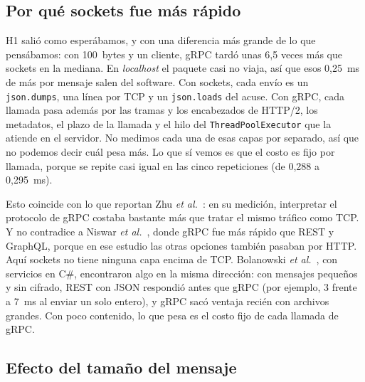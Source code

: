 \subsection{Por qué sockets fue más rápido}

H1 salió como esperábamos, y con una diferencia más grande de lo que pensábamos: con 100~bytes y un cliente, gRPC tardó unas 6,5 veces más que sockets en la mediana. En \emph{localhost} el paquete casi no viaja, así que esos 0,25~ms de más por mensaje salen del software. Con sockets, cada envío es un \texttt{json.dumps}, una línea por TCP y un \texttt{json.loads} del acuse. Con gRPC, cada llamada pasa además por las tramas y los encabezados de HTTP/2, los metadatos, el plazo de la llamada y el hilo del \texttt{ThreadPoolExecutor} que la atiende en el servidor. No medimos cada una de esas capas por separado, así que no podemos decir cuál pesa más. Lo que sí vemos es que el costo es fijo por llamada, porque se repite casi igual en las cinco repeticiones (de 0,288 a 0,295~ms).

Esto coincide con lo que reportan Zhu \emph{et al.}~\cite{Zhu2023}: en su medición, interpretar el protocolo de gRPC costaba bastante más que tratar el mismo tráfico como TCP. Y no contradice a Niswar \emph{et al.}~\cite{Niswar2024}, donde gRPC fue más rápido que REST y GraphQL, porque en ese estudio las otras opciones también pasaban por HTTP. Aquí sockets no tiene ninguna capa encima de TCP. Bolanowski \emph{et al.}~\cite{Bolanowski2022}, con servicios en C\#, encontraron algo en la misma dirección: con mensajes pequeños y sin cifrado, REST con JSON respondió antes que gRPC (por ejemplo, 3 frente a 7~ms al enviar un solo entero), y gRPC sacó ventaja recién con archivos grandes. Con poco contenido, lo que pesa es el costo fijo de cada llamada de gRPC.

\subsection{Efecto del tamaño del mensaje}

